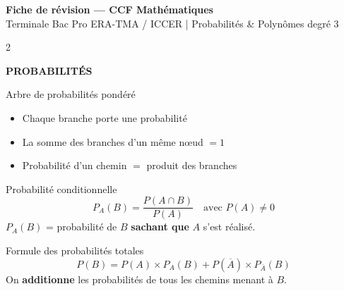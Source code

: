 \documentclass[a4paper,10pt]{article}
\begin{document}
\begin{center}
{\Large\bfseries\color{bleupro} Fiche de révision — CCF Mathématiques}\\[4pt]
{\normalsize Terminale Bac Pro ERA-TMA / ICCER \quad | \quad Probabilités \& Polynômes degré 3}
\end{center}

\vspace{6pt}
\begin{multicols}{2}

{\large\bfseries\color{bleupro} PROBABILITÉS}
\vspace{4pt}

\begin{defbox}{Arbre de probabilités pondéré}
\begin{itemize}[nosep,leftmargin=12pt]
  \item Chaque branche porte une probabilité
  \item La somme des branches d'un même nœud $= 1$
  \item Probabilité d'un chemin $=$ produit des branches
\end{itemize}
\begin{center}
\end{center}
\end{defbox}

\begin{defbox}{Probabilité conditionnelle}
$$P_A(B) = \frac{P(A \cap B)}{P(A)} \quad \text{avec } P(A) \neq 0$$
$P_A(B)$ = probabilité de $B$ \textbf{sachant que} $A$ s'est réalisé.
\end{defbox}

\begin{defbox}{Formule des probabilités totales}
$$\boxed{P(B) = P(A) \times P_A(B) + P(\overline{A}) \times P_{\overline{A}}(B)}$$
On \textbf{additionne} les probabilités de tous les chemins menant à $B$.
\end{defbox}


\end{multicols}
\end{document}
